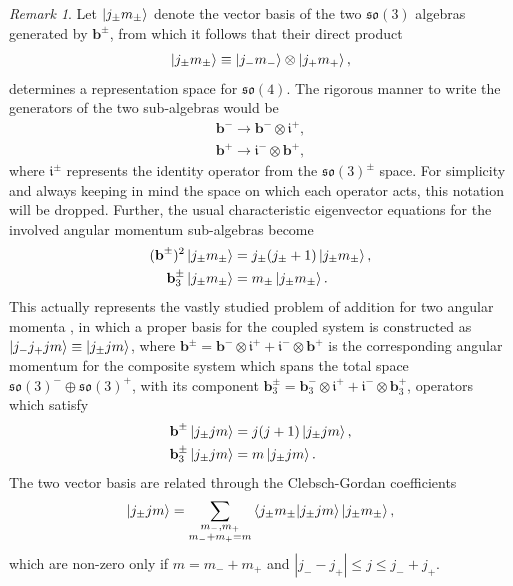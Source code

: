 \documentclass[12pt,a4paper]{report}
\theoremstyle{definition}
\theoremstyle{remark}
\newtheorem*{remark}{Remark}
\theoremstyle{remark}
\begin{document}
\begin{remark}
Let $\ket{j_\pm m_\pm}$ denote the vector basis of the two $\mathfrak{so}(3)$ algebras generated by $\textbf{b}^\pm$, from which it follows that their direct product
\begin{align*}
\ket{j_\pm m_\pm}\equiv\ket{j_-m_-}\otimes\ket{j_+m_+},
\end{align*}
determines a representation space for $\mathfrak{so}(4)$. The rigorous manner to write the generators of the two sub-algebras would be
\begin{align*}
\textbf{b}^-\rightarrow \textbf{b}^- \otimes \mathfrak{i}^+, \\
\textbf{b}^+\rightarrow \mathfrak{i}^-\otimes\textbf{b}^+,
\end{align*}
where $\mathfrak{i}^\pm$ represents the identity operator from the $\mathfrak{so}(3)^\pm$ space. For simplicity and always keeping in mind the space on which each operator acts, this notation will be dropped. Further, the usual characteristic eigenvector equations for the involved angular momentum sub-algebras become
\begin{align*}
(\textbf{b}^\pm)^2\ket{j_\pm m_\pm}&= j_\pm(j_\pm+1)\ket{j_\pm m_\pm}, \\
\textbf{b}^\pm_3\ket{j_\pm m_\pm}&= m_\pm\ket{j_\pm m_\pm}.
\end{align*}
This actually represents the vastly studied problem of addition for two angular momenta \cite{zetilli}\cite{sakurai}, in which a proper basis for the coupled system is constructed as $\ket{j_-j_+jm}\equiv\ket{j_\pm jm}$, where $\textbf{b}^\pm=\textbf{b}^-\otimes\mathfrak{i}^++\mathfrak{i}^-\otimes\textbf{b}^+$ is the corresponding angular momentum for the composite system which spans the total space $\mathfrak{so}(3)^-\oplus \mathfrak{so}(3)^+$, with its component $\textbf{b}^\pm_3=\textbf{b}^-_3\otimes\mathfrak{i}^++\mathfrak{i}^-\otimes\textbf{b}^+_3$, operators which satisfy
\begin{align*}
\textbf{b}^\pm\ket{j_\pm jm}&= j(j+1)\ket{j_\pm jm}, \\
\textbf{b}^\pm_3\ket{j_\pm jm}&= m\ket{j_\pm jm}.
\end{align*}
The two vector basis are related through the Clebsch-Gordan coefficients
\begin{align*}
\ket{j_\pm jm}=\sum\limits_{\substack{m_-,m_+ \\ m_-+m_+=m}}\braket{j_\pm m_\pm|j_\pm jm}\ket{j_\pm m_\pm},
\end{align*}
which are non-zero only if $m=m_-+m_+$ and $|j_--j_+|\leq j\leq j_-+j_+$.
\end{remark}
\end{document}

